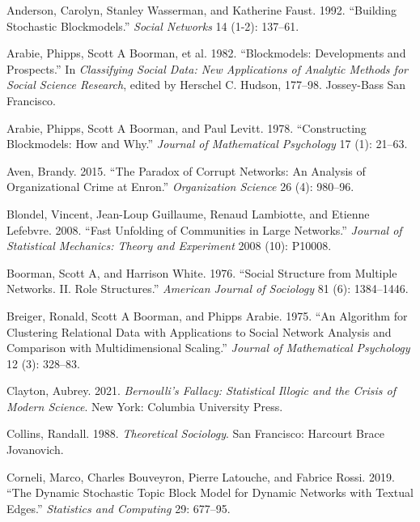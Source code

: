 \documentclass[
  12pt,
  a4paper,
  DIV=11,
  numbers=noendperiod,
  twoside,
  open=any]{scrartcl}
\newlength{\cslhangindent}
\newenvironment{CSLReferences}[2] %
 {\begin{list}{}{%
  \setlength{\itemindent}{0pt}
  \setlength{\leftmargin}{0pt}
  \setlength{\parsep}{0pt}
  \ifodd #1
   \setlength{\leftmargin}{\cslhangindent}
   \setlength{\itemindent}{-1\cslhangindent}
  \fi
  \setlength{\itemsep}{#2\baselineskip}}}
 {\end{list}}
\begin{document}
\label{refs}
\begin{CSLReferences}{1}{0}
Anderson, Carolyn, Stanley Wasserman, and Katherine Faust. 1992.
{``Building Stochastic Blockmodels.''} \emph{Social Networks} 14 (1-2):
137--61.

Arabie, Phipps, Scott A Boorman, et al. 1982. {``Blockmodels:
Developments and Prospects.''} In \emph{Classifying Social Data: New
Applications of Analytic Methods for Social Science Research}, edited by
Herschel C. Hudson, 177--98. Jossey-Bass San Francisco.

Arabie, Phipps, Scott A Boorman, and Paul Levitt. 1978. {``Constructing
Blockmodels: How and Why.''} \emph{Journal of Mathematical Psychology}
17 (1): 21--63.

Aven, Brandy. 2015. {``The Paradox of Corrupt Networks: An Analysis of
Organizational Crime at Enron.''} \emph{Organization Science} 26 (4):
980--96.

Blondel, Vincent, Jean-Loup Guillaume, Renaud Lambiotte, and Etienne
Lefebvre. 2008. {``Fast Unfolding of Communities in Large Networks.''}
\emph{Journal of Statistical Mechanics: Theory and Experiment} 2008
(10): P10008.

Boorman, Scott A, and Harrison White. 1976. {``Social Structure from
Multiple Networks. II. Role Structures.''} \emph{American Journal of
Sociology} 81 (6): 1384--1446.

Breiger, Ronald, Scott A Boorman, and Phipps Arabie. 1975. {``An
Algorithm for Clustering Relational Data with Applications to Social
Network Analysis and Comparison with Multidimensional Scaling.''}
\emph{Journal of Mathematical Psychology} 12 (3): 328--83.

Clayton, Aubrey. 2021. \emph{Bernoulli's Fallacy: Statistical Illogic
and the Crisis of Modern Science}. New York: Columbia University Press.

Collins, Randall. 1988. \emph{Theoretical Sociology}. San Francisco:
Harcourt Brace Jovanovich.

Corneli, Marco, Charles Bouveyron, Pierre Latouche, and Fabrice Rossi.
2019. {``The Dynamic Stochastic Topic Block Model for Dynamic Networks
with Textual Edges.''} \emph{Statistics and Computing} 29: 677--95.


\end{CSLReferences}
\end{document}
